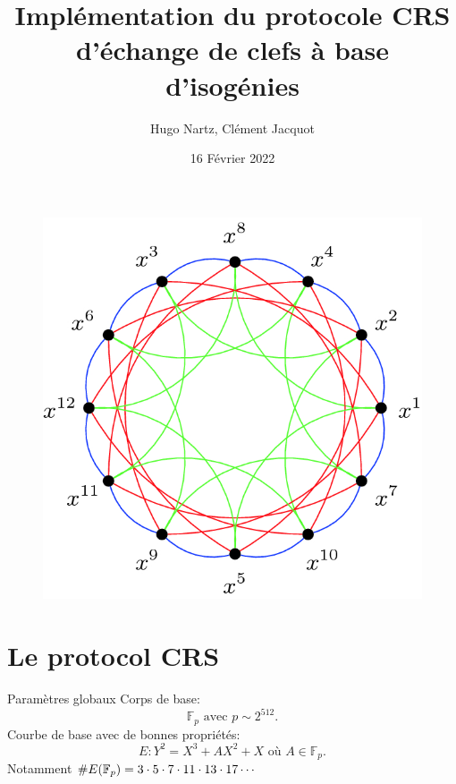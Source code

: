 \documentclass{beamer}
\title{Implémentation du protocole CRS d'échange de clefs à base d'isogénies }
\author{Hugo Nartz, Cl\'ement Jacquot}
\date{16 F\'evrier 2022}
\begin{document}
\begin{frame}
  \titlepage
\begin{figure}[h]
\centering
\includegraphics[scale=0.13]{../figs/isoGraph}
\end{figure}
\end{frame}

\begin{frame}{}
  \tableofcontents
\end{frame}

\section{Le protocol CRS}

\begin{frame}{Param\`etres globaux}
	Corps de base:
	\[
		\mathbb{F}_p \text{ avec } p\sim 2^{512}.
	\]
	Courbe de base avec de bonnes propri\'et\'es:
	\[
		E: Y^2 = X^3 + AX^2 + X  \text{ o\`u } A\in  \mathbb{F}_p.
	\]
	Notamment $\# E(\mathbb{F}_p) = 3\cdot 5\cdot 7\cdot 11 \cdot 13\cdot 17\cdots$
\end{frame}
\end{document}
